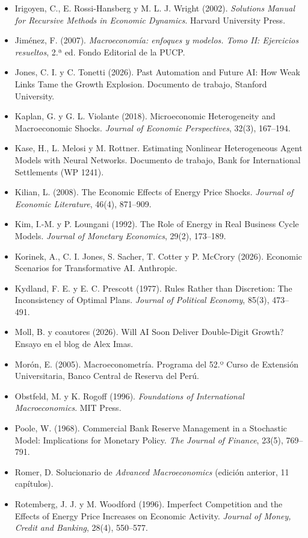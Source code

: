 \documentclass[11pt,a4paper]{article}
\begin{document}
{\begin{itemize}[leftmargin=1.4em,itemsep=1pt,label={}]
\item Irigoyen, C., E. Rossi-Hansberg y M. L. J. Wright (2002). \emph{Solutions Manual for Recursive Methods in Economic Dynamics}. Harvard University Press.
\item Jiménez, F. (2007). \emph{Macroeconomía: enfoques y modelos. Tomo II: Ejercicios resueltos}, 2.ª ed. Fondo Editorial de la PUCP.
\item Jones, C. I. y C. Tonetti (2026). Past Automation and Future AI: How Weak Links Tame the Growth Explosion. Documento de trabajo, Stanford University.
\item Kaplan, G. y G. L. Violante (2018). Microeconomic Heterogeneity and Macroeconomic Shocks. \emph{Journal of Economic Perspectives}, 32(3), 167--194.
\item Kase, H., L. Melosi y M. Rottner. Estimating Nonlinear Heterogeneous Agent Models with Neural Networks. Documento de trabajo, Bank for International Settlements (WP 1241).
\item Kilian, L. (2008). The Economic Effects of Energy Price Shocks. \emph{Journal of Economic Literature}, 46(4), 871--909.
\item Kim, I.-M. y P. Loungani (1992). The Role of Energy in Real Business Cycle Models. \emph{Journal of Monetary Economics}, 29(2), 173--189.
\item Korinek, A., C. I. Jones, S. Sacher, T. Cotter y P. McCrory (2026). Economic Scenarios for Transformative AI. Anthropic.
\item Kydland, F. E. y E. C. Prescott (1977). Rules Rather than Discretion: The Inconsistency of Optimal Plans. \emph{Journal of Political Economy}, 85(3), 473--491.
\item Moll, B. y coautores (2026). Will AI Soon Deliver Double-Digit Growth? Ensayo en el blog de Alex Imas.
\item Morón, E. (2005). Macroeconometría. Programa del 52.º Curso de Extensión Universitaria, Banco Central de Reserva del Perú.
\item Obstfeld, M. y K. Rogoff (1996). \emph{Foundations of International Macroeconomics}. MIT Press.
\item Poole, W. (1968). Commercial Bank Reserve Management in a Stochastic Model: Implications for Monetary Policy. \emph{The Journal of Finance}, 23(5), 769--791.
\item Romer, D. Solucionario de \emph{Advanced Macroeconomics} (edición anterior, 11 capítulos).
\item Rotemberg, J. J. y M. Woodford (1996). Imperfect Competition and the Effects of Energy Price Increases on Economic Activity. \emph{Journal of Money, Credit and Banking}, 28(4), 550--577.

\end{itemize}}
\end{document}
